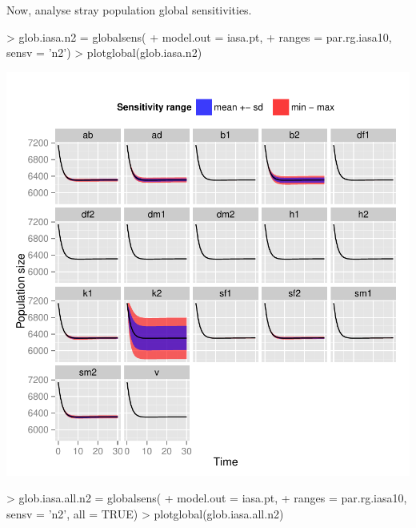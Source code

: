 \documentclass[a4paper]{article}
\begin{document}
Now, analyse stray population global sensitivities.
\begin{Schunk}
\begin{Sinput}
> glob.iasa.n2 = globalsens(
+   model.out = iasa.pt,
+   ranges = par.rg.iasa10, sensv = 'n2')
> plotglobal(glob.iasa.n2)
\end{Sinput}
\end{Schunk}
\begin{center}
\includegraphics{capm_example-037}
\end{center}
\begin{Schunk}
\begin{Sinput}
> glob.iasa.all.n2 = globalsens(
+   model.out = iasa.pt,
+   ranges = par.rg.iasa10, sensv = 'n2', all = TRUE)
> plotglobal(glob.iasa.all.n2)
\end{Sinput}
\end{Schunk}
\end{document}

